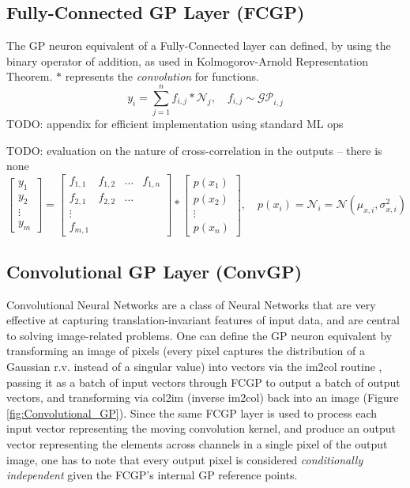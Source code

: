 \documentclass{article}
\begin{document}
\subsection{Fully-Connected GP Layer (FCGP)}
The GP neuron equivalent of a Fully-Connected layer can defined, by using the binary operator of addition, as used in Kolmogorov-Arnold Representation Theorem. $\ast$ represents the \textit{convolution} for functions.
\begin{equation}
    y_i = \sum_{j=1}^{n} f_{i,j} \ast \mathcal{N}_j, \quad f_{i,j}\sim\mathcal{GP}_{i,j}
\end{equation}
TODO: appendix for efficient implementation using standard ML ops

TODO: evaluation on the nature of cross-correlation in the outputs -- there is none
\begin{equation}
    \begin{bmatrix}
        y_1 \\ y_2 \\ \vdots \\ y_m
    \end{bmatrix} =
    \begin{bmatrix}
        f_{1,1} & f_{1,2} & \hdots & f_{1,n} \\
        f_{2,1} & f_{2,2} & \hdots \\
        \vdots \\
        f_{m,1}
    \end{bmatrix}\ast
    \begin{bmatrix}
        p(x_1) \\ p(x_2) \\ \vdots \\ p(x_n)
    \end{bmatrix},\quad p(x_i) = \mathcal{N}_i = \mathcal{N}(\mu_{x,i},\sigma_{x,i}^2)
\end{equation}

\subsection{Convolutional GP Layer (ConvGP)}
Convolutional Neural Networks \cite{CNN} are a class of Neural Networks that are very effective at capturing translation-invariant features of input data, and are central to solving image-related problems. One can define the GP neuron equivalent by transforming an image of pixels (every pixel captures the distribution of a Gaussian r.v. instead of a singular value) into vectors via the im2col routine \cite{im2col_first,im2col_phdthesis}, passing it as a batch of input vectors through FCGP to output a batch of output vectors, and transforming via col2im (inverse im2col) back into an image (Figure \ref{fig:Convolutional_GP}). Since the same FCGP layer is used to process each input vector representing the moving convolution kernel, and produce an output vector representing the elements across channels in a single pixel of the output image, one has to note that every output pixel is considered \textit{conditionally independent} given the FCGP's internal GP reference points.
\end{document}
